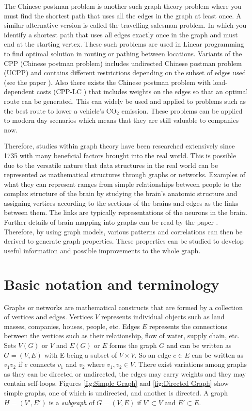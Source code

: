 The Chinese postman problem is another such graph theory problem where you must find the shortest path that uses all the edges in the graph at least once. A similar alternative version is called the travelling salesman problem. In which you identify a shortest path that uses all edges exactly once in the graph and must end at the starting vertex. These such problems are used in Linear programming to find optimal solution in routing or pathing between locations. Variants of the CPP (Chinese postman problem) includes undirected Chinese postman problem (UCPP) and contains different restrictions depending on the subset of edges used (see the paper \cite{IrnichStefan2008Uppw}). Also there exists the Chinese postman problem with load-dependent costs (CPP-LC \cite{CorberánÁngel2018TCPP}) that includes weights on the edges so that an optimal route can be generated. This can widely be used and applied to problems such as the best route to lower a vehicle's CO$_2$ emission. These problems can be applied to modern day scenarios which means that they are still valuable to companies now.
\newline

Therefore, studies within graph theory have been researched extensively since 1735 with many beneficial factors brought into the real world. This is possible due to the versatile nature that data structures in the real world can be represented as mathematical structures through graphs or networks. Examples of what they can represent ranges from simple relationships between people to the complex structure of the brain by studying the brain's anatomic structure and assigning vertices according to the sections of the brains and edges as the links between them. The links are typically representations of the neurons in the brain. Further details of brain mapping into graphs can be read by the paper \cite{articlebrain}. Therefore, by using graph models, various patterns and correlations can then be derived to generate graph properties. These properties can be studied to develop useful information and possible improvements to the whole graph.

\section{Basic notation and terminology}
Graphs or networks are mathematical constructs that are formed by a collection of vertices and edges. Vertices $V$ represents individual objects such as land masses, companies, houses, people, etc. Edges $E$ represents the connections between the vertices such as their relationship, flow of water, supply chain, etc. Sets $V(G)$ or $V$ and $E(G)$ or $E$ forms the graph $G$ and can be written as $G=(V, E)$ with E being a subset of $V \times V$. So an edge $e \in E$ can be written as $v_{1}v_{2}$ if $e$ connects $v_{1}$ and $v_{2}$ where $v_{1}, v_{2} \in V$. There exist variations among graphs as they can be directed or undirected, the edges may carry weights and they may contain self-loops. Figures \ref{fig:Simple Graph} and \ref{fig:Directed Graph} show simple graphs, one of which is undirected, and another is directed. A graph $H = (V', E')$ is a \emph{subgraph} of $G=(V, E)$ if $V' \subset V$ and $E' \subset E$.

